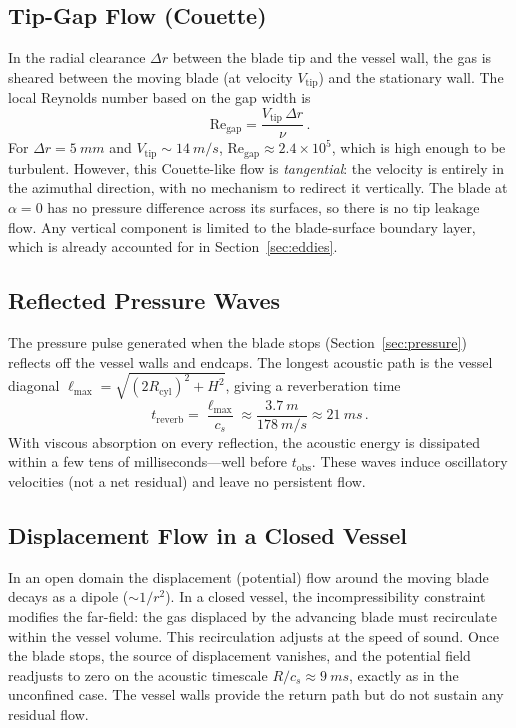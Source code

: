 \documentclass[11pt,a4paper]{article}
\begin{document}
\subsection{Tip-Gap Flow (Couette)}

In the radial clearance $\Delta r$ between the blade tip and the
vessel wall, the gas is sheared between the moving blade
(at velocity $V_\mathrm{tip}$) and the stationary wall. The local
Reynolds number based on the gap width is
\begin{equation}
  \mathrm{Re}_\mathrm{gap}
    = \frac{V_\mathrm{tip}\,\Delta r}{\nu}\,.
\end{equation}
For $\Delta r = \SI{5}{mm}$ and $V_\mathrm{tip} \sim \SI{14}{m/s}$,
$\mathrm{Re}_\mathrm{gap} \approx 2.4 \times 10^5$, which is high
enough to be turbulent. However, this Couette-like flow is
\emph{tangential}: the velocity is entirely in the azimuthal
direction, with no mechanism to redirect it vertically. The blade at
$\alpha = 0$ has no pressure difference across its surfaces, so there
is no tip leakage flow. Any vertical component is limited to the
blade-surface boundary layer, which is already accounted for in
Section~\ref{sec:eddies}.

\subsection{Reflected Pressure Waves}

The pressure pulse generated when the blade stops
(Section~\ref{sec:pressure}) reflects off the vessel walls and
endcaps. The longest acoustic path is the vessel diagonal
$\ell_\mathrm{max} = \sqrt{(2R_\mathrm{cyl})^2 + H^2}$, giving a
reverberation time
\begin{equation}
  t_\mathrm{reverb} = \frac{\ell_\mathrm{max}}{c_s}
    \approx \frac{\SI{3.7}{m}}{\SI{178}{m/s}}
    \approx \SI{21}{ms}\,.
\end{equation}
With viscous absorption on every reflection, the acoustic energy is
dissipated within a few tens of milliseconds---well before
$t_\mathrm{obs}$. These waves induce oscillatory velocities (not a
net residual) and leave no persistent flow.

\subsection{Displacement Flow in a Closed Vessel}

In an open domain the displacement (potential) flow around the moving
blade decays as a dipole ($\sim 1/r^2$). In a closed vessel, the
incompressibility constraint modifies the far-field: the gas displaced
by the advancing blade must recirculate within the vessel volume. This
recirculation adjusts at the speed of sound. Once the blade stops, the
source of displacement vanishes, and the potential field readjusts to
zero on the acoustic timescale $R/c_s \approx \SI{9}{ms}$, exactly as
in the unconfined case. The vessel walls provide the return path but
do not sustain any residual flow.
\end{document}
